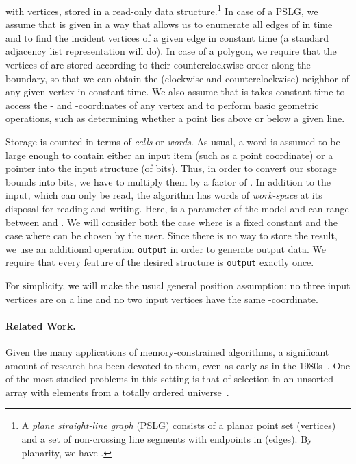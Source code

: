 \documentclass[11pt,a4paper]{article}
\newcommand{\pslg}{PSLG}
\begin{document}
with  vertices, stored in a read-only data structure.\footnote{A
\emph{plane straight-line graph} (PSLG) consists of a planar point set 
(vertices) and a set  of non-crossing line segments
 with endpoints in  (edges). By planarity, we have .}
In case of a \pslg, we assume that  is given in a way
that allows us to enumerate all edges of  in  time and to find the
incident vertices of a given edge in constant time (a standard adjacency
list representation will do).
In case of a polygon, we require that the vertices of  are stored according
to their counterclockwise order along the boundary, so
that we can obtain the (clockwise and counterclockwise) neighbor
of any given vertex in constant time.
We also assume that is takes constant time to access the -
and -coordinates of any  vertex
and to perform basic geometric operations, such as determining
whether a point lies above or below a given line.

Storage is counted in terms of \emph{cells} or \emph{words}.
As usual, a word is assumed to be large enough to contain either
an input item (such as a point coordinate)
or a pointer into the input structure (of  bits).
Thus, in order to convert our storage bounds into
bits, we have to multiply them by a factor of .
In addition to the input, which can only be read, the algorithm has
 words of \emph{work-space} at its disposal for reading and writing.
Here,  is a parameter of the model and can range between  and .
We will consider both the case where  is a fixed constant
and the case where  can be chosen by the user. Since there is no way
to store the result, we use an additional operation \texttt{output} in order
to generate output data. We require that every feature
of the desired structure is \texttt{output} exactly once.

For simplicity, we will make the usual general position assumption:
no three input vertices are on a line and no two input vertices have
the same -coordinate.


\paragraph{Related Work.}
Given the many applications of memory-constrained algorithms, a
significant amount of research has been devoted to them,
even as early as in the 1980s~\cite{MunroPa80}.
One of the most studied problems in this setting is that of
selection in an unsorted array with elements from a totally ordered
universe~\cite{MunroRa96,MunroPa80,Frederickson87,RamanRa98,Chan10}.
\end{document}
